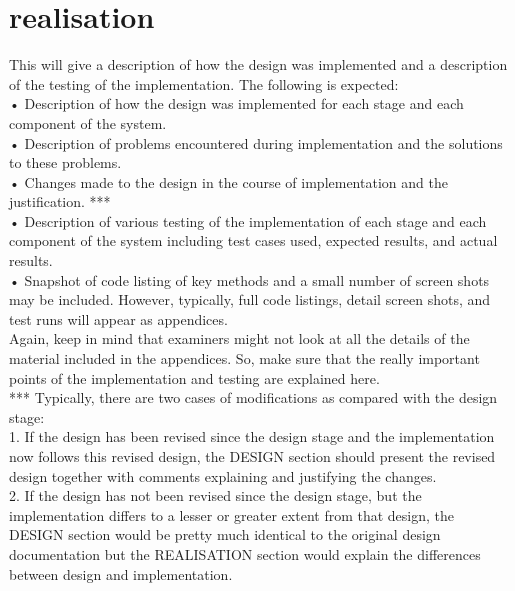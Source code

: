 \chapter{realisation}
\label{ch:realisation}

This will give a description of how the design was implemented and a description of the testing of the implementation. The following is expected: \\
• Description of how the design was implemented for each stage and each
component of the system. \\
• Description of problems encountered during implementation and the solutions to these problems.\\
• Changes made to the design in the course of implementation and the
justification. *** \\
• Description of various testing of the implementation of each stage and each component of the system including test cases used, expected results, and actual results. \\
• Snapshot of code listing of key methods and a small number of screen shots may be included. However, typically, full code listings, detail screen shots, and test runs will appear as appendices.\\
Again, keep in mind that examiners might not look at all the details of the material included in the appendices. So, make sure that the really important points of the implementation and testing are explained here.\\
*** Typically, there are two cases of modifications as compared with the design stage:\\
1. If the design has been revised since the design stage and the implementation now follows this revised design, the DESIGN section should present the revised design together with comments explaining and justifying the changes.\\
2. If the design has not been revised since the design stage, but the
implementation differs to a lesser or greater extent from that design, the
DESIGN section would be pretty much identical to the original design 
documentation but the REALISATION section would explain the differences
between design and implementation. \\